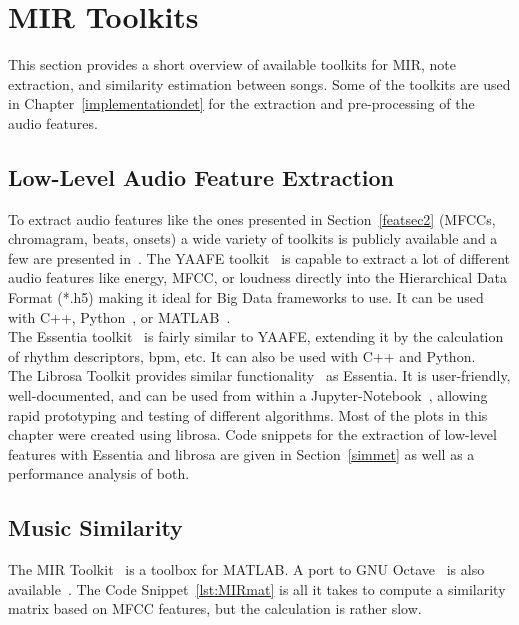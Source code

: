 \section{MIR Toolkits}\label{mirtoolkit}

This section provides a short overview of available toolkits for MIR, note extraction, and similarity estimation between songs. Some of the toolkits are used in Chapter~\ref{implementationdet} for the extraction and pre-processing of the audio features.

\subsection{Low-Level Audio Feature Extraction}
To extract audio features like the ones presented in Section~\ref{featsec2} (MFCCs, chromagram, beats, onsets) a wide variety of toolkits is publicly available and a few are presented in~\cite{audiofeattoolb}.
The YAAFE toolkit~\cite{yaafe1} is capable to extract a lot of different audio features like energy, MFCC, or loudness directly into the Hierarchical Data Format (*.h5) making it ideal for Big Data frameworks to use. It can be used with C++, Python~\cite{pylang}, or MATLAB~\cite{matl1}.\\
The Essentia toolkit~\cite{essentia1} is fairly similar to YAAFE, extending it by the calculation of rhythm descriptors, bpm, etc. It can also be used with C++ and Python.\\
The Librosa Toolkit provides similar functionality~\cite{labrosa1} as Essentia. It is user-friendly, well-documented, and can be used from within a Jupyter-Notebook~\cite{jupyter}, allowing rapid prototyping and testing of different algorithms. Most of the plots in this chapter were created using librosa. Code snippets for the extraction of low-level features with Essentia and librosa are given in Section~\ref{simmet} as well as a performance analysis of both.\\

\subsection{Music Similarity}
The MIR Toolkit~\cite{mirtoolbox1} is a toolbox for MATLAB. A port to GNU Octave~\cite{octave1} is also available~\cite{mirtoolbox2}. The Code Snippet~\ref{lst:MIRmat} is all it takes to compute a similarity matrix based on MFCC features, but the calculation is rather slow.

\lstset{language=Matlab}          %
\FloatBarrier

